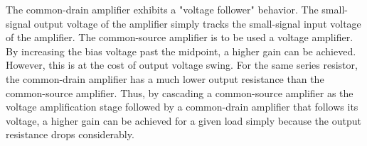 The common-drain amplifier exhibits a "voltage follower" behavior.
The small-signal output voltage of the amplifier simply tracks the small-signal input voltage of the amplifier.
The common-source amplifier is to be used a voltage amplifier.
By increasing the bias voltage past the midpoint, a higher gain can be achieved.
However, this is at the cost of output voltage swing.
For the same series resistor, the common-drain amplifier has a much lower output resistance than the common-source amplifier.
Thus, by cascading a common-source amplifier as the voltage amplification stage followed by a common-drain amplifier that follows its voltage, a higher gain can be achieved for a given load simply because the output resistance drops considerably.
